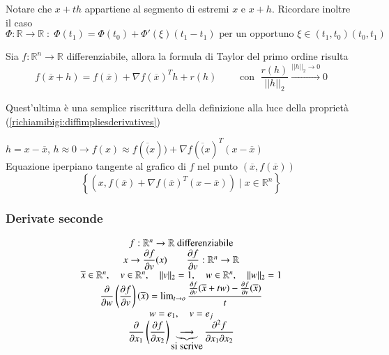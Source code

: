 \begin{notes}
Notare che $x + th$ appartiene al segmento di estremi $x$ e $x+h$.
Ricordare inoltre il caso
$$  \Phi : \mathbb{R} \rightarrow \mathbb{R}\; : \;
\Phi(t_1) = \Phi(t_0) +   \Phi'(\xi)(t_1 -t_1)
\text{ per un opportuno } \xi
\in (t_1, t_0)
(t_0,t_1) 
$$
\end{notes}

\begin{defn}
Sia $f:\mathbb{R}^{n} \rightarrow \mathbb{R}$ differenziabile, allora la formula
di Taylor del primo ordine risulta
$$ 
f(\overline{x} + h) =
 f(\overline{x}) + \nabla f (\overline{x})^T h + r(h)
\qquad \text{ con  }\; 
\dfrac{r(h)}{||h||_{2}} \xrightarrow{ || h ||_{2} \to 0} 0$$
\end{defn}
Quest'ultima \`e una semplice riscrittura della definizione
alla luce della propriet\`a (\ref{richiamibigi:diffimpliesderivatives}) 

\begin{defn}
$h = x - \overline{x}$, $h \approx 0  
\rightarrow f(x) \approx f(\overline(x))
 + \nabla f(\overline(x)^{T}(x - \overline{x})$
\\
Equazione iperpiano tangente al grafico di $f$ nel punto
 $(\overline{x}, f(\overline{x}))$
$$ \left\{ (x, f(\overline{x}) + \nabla f(\overline{x})^{T}(x-\overline{x})) 
\; | \; x \in \mathbb{R}^{n} \right\}$$
\end{defn}


\subsubsection{Derivate seconde}
$$
\begin{array}c
f:\mathbb{R}^n \to \mathbb{R} ~ \mbox{differenziabile}\\
x \to \dfrac{\partial f}{\partial v}(x) \qquad \dfrac{\partial f}{\partial v}: \mathbb{R}^n \to \mathbb{R}\\
\overline{x} \in \mathbb{R}^n, \quad v \in \mathbb{R}^n, \quad \Vert v \Vert_2 = 1, \quad w \in \mathbb{R}^n, \quad \Vert w \Vert_2 = 1\\
\dfrac{\partial}{\partial w}\left(\dfrac{\partial f}{\partial v} \right)(\overline{x}) = \lim_{t \to o}\dfrac{\frac{\partial f}{\partial v}(\overline{x} + tw)-\frac{\partial f}{\partial v}(\overline{x})}{t}\\
w = e_1, \quad v = e_j\\
\dfrac{\partial}{\partial x_1}\left(\dfrac{\partial f}{\partial x_2}\right) \underbrace{\longrightarrow}_{\mbox{si scrive}} \dfrac{\partial^2 f}{\partial x_1 \partial x_2}
\end{array}
$$  


